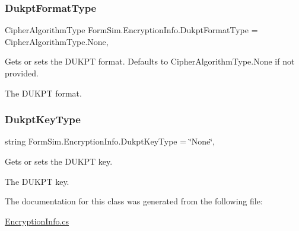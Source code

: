 \subsubsection{\texorpdfstring{Dukpt\+Format\+Type}{DukptFormatType}}
{\footnotesize\ttfamily Cipher\+Algorithm\+Type Form\+Sim.\+Encryption\+Info.\+Dukpt\+Format\+Type = Cipher\+Algorithm\+Type.\+None\hspace{0.3cm}{\ttfamily [get]}, {\ttfamily [set]}}



Gets or sets the D\+U\+K\+PT format. Defaults to Cipher\+Algorithm\+Type.\+None if not provided. 

The D\+U\+K\+PT format.\mbox{\label{class_form_sim_1_1_encryption_info_ac02bcaed68e7b3995102172b8f9d2d7b}} 
\subsubsection{\texorpdfstring{Dukpt\+Key\+Type}{DukptKeyType}}
{\footnotesize\ttfamily string Form\+Sim.\+Encryption\+Info.\+Dukpt\+Key\+Type = \char`\"{}None\char`\"{}\hspace{0.3cm}{\ttfamily [get]}, {\ttfamily [set]}}



Gets or sets the D\+U\+K\+PT key. 

The D\+U\+K\+PT key.

The documentation for this class was generated from the following file\+:\begin{DoxyCompactItemize}
\item 
\mbox{\hyperlink{_encryption_info_8cs}{Encryption\+Info.\+cs}}\end{DoxyCompactItemize}
